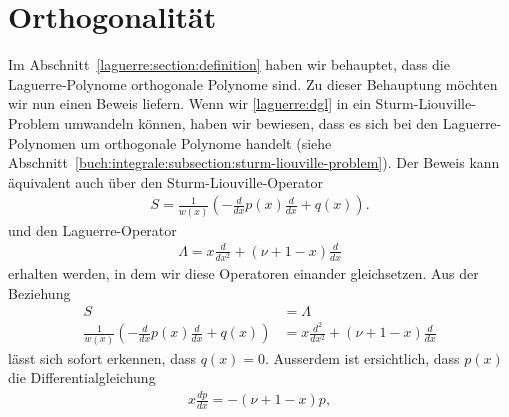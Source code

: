 %
%
%


\section{Orthogonalität
  \label{laguerre:section:orthogonal}}
Im Abschnitt~\ref{laguerre:section:definition} haben wir behauptet,
dass die Laguerre-Polynome orthogonale Polynome sind.
Zu dieser Behauptung möchten wir nun einen Beweis liefern.
Wenn wir \eqref{laguerre:dgl} in ein
Sturm-Liouville-Problem umwandeln können, haben wir bewiesen, dass es sich
bei den Laguerre-Polynomen um orthogonale Polynome handelt (siehe
Abschnitt~\ref{buch:integrale:subsection:sturm-liouville-problem}).
Der Beweis kann äquivalent auch über den Sturm-Liouville-Operator
\begin{align}
S
=
\frac{1}{w(x)} \left(-\frac{d}{dx}p(x) \frac{d}{dx} + q(x) \right).
\label{laguerre:slop}
\end{align}
und den Laguerre-Operator
\begin{align}
\Lambda
=
x \frac{d}{dx^2} + (\nu + 1 -x) \frac{d}{dx}
\end{align}
erhalten werden,
in dem wir diese Operatoren einander gleichsetzen.
Aus der Beziehung
\begin{align}
S
 & =
\Lambda
\nonumber
\\
\frac{1}{w(x)} \left(-\frac{d}{dx}p(x) \frac{d}{dx} + q(x) \right)
 & =
x \frac{d^2}{dx^2} + (\nu + 1 - x) \frac{d}{dx}
\label{laguerre:sl-lag}
\end{align}
lässt sich sofort erkennen, dass $q(x) = 0$.
Ausserdem ist ersichtlich, dass $p(x)$ die Differentialgleichung
\begin{align*}
x \frac{dp}{dx}
=
-(\nu + 1 - x) p,
\end{align*}
